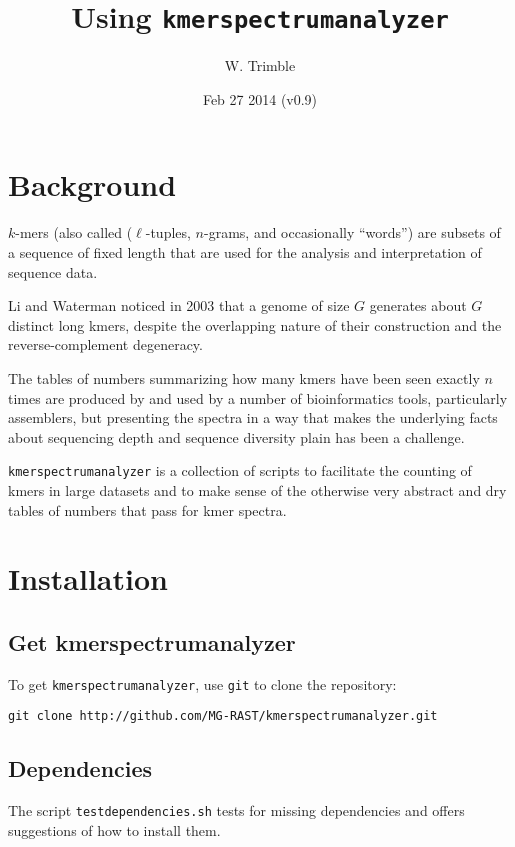 \documentclass[11pt,fullpage]{article}
\begin{document}
\author{W. Trimble}
\date{Feb 27 2014 (v0.9)}
\title{Using \texttt{kmerspectrumanalyzer} }
\maketitle
{}
\section{Background}
$k$-mers (also called ($\ell$-tuples, $n$-grams, and occasionally ``words'') are
subsets of a sequence of fixed length that are used for the analysis and
interpretation of sequence data.   

Li and Waterman noticed in 2003 that a genome of size $G$ generates about $G$ distinct
long kmers, despite the overlapping nature of their construction and the reverse-complement
degeneracy.

The tables of numbers summarizing how many kmers have been seen exactly $n$ times 
are produced by and used by a number of bioinformatics tools, particularly assemblers,
but presenting the spectra in a way that makes the underlying 
facts about sequencing depth and sequence diversity plain has been a challenge.

\texttt{kmerspectrumanalyzer} is a collection of scripts to facilitate the counting of 
kmers in large datasets and to make sense of the otherwise very abstract and dry tables
of numbers that pass for kmer spectra.  

\section{Installation}
\subsection{Get kmerspectrumanalyzer} 
To get \texttt{kmerspectrumanalyzer}, use \texttt{git} to clone the repository:
\begin{verbatim}
git clone http://github.com/MG-RAST/kmerspectrumanalyzer.git
\end{verbatim}

\subsection{Dependencies} 
The script \texttt{testdependencies.sh} tests for missing dependencies and 
offers suggestions of how to install them.    
\end{document}
